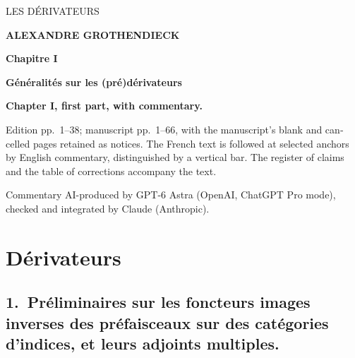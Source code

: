 \documentclass[11pt]{article}
\newcommand{\printedpage}[1]{\marginpar{\footnotesize p.~#1}}
\newcommand{\msp}[1]{\marginpar{\footnotesize [#1]}}
\begin{document}
\printedpage{--} %

\begin{center}
{\Large\textsf{LES DÉRIVATEURS}}

\bigskip

\textbf{ALEXANDRE GROTHENDIECK}

\bigskip\bigskip

\textbf{Chapitre I}

\medskip

\textbf{Généralités sur les (pré)dérivateurs}
\end{center}

\vfill
\begin{otherlanguage}{english}
\noindent\textbf{Chapter I, first part, with commentary.}\par\smallskip
\noindent Edition pp.~1--38; manuscript pp.~1--66, with the manuscript's
blank and cancelled pages retained as notices. The French text is followed
at selected anchors by English commentary, distinguished by a vertical bar.
The register of claims and the table of corrections accompany the text.\par\medskip
\noindent\small Commentary AI-produced by GPT-6 Astra (OpenAI, ChatGPT Pro mode), checked and integrated by Claude (Anthropic).\par
\end{otherlanguage}


\clearpage

\printedpage{--} %


\clearpage

\printedpage{1}

\msp{page 1}

\section*{Dérivateurs}

\subsection*{\textmd{1.}\ Préliminaires sur les foncteurs images inverses des préfaisceaux sur des catégories d'indices, et leurs adjoints multiples.}
\end{document}
